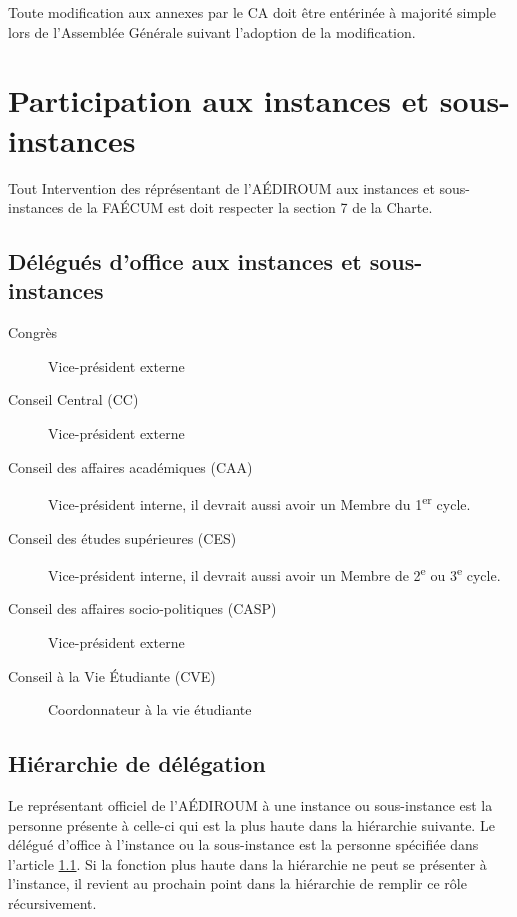 \documentclass{aediroum}
\newcommand{\article}[1]{article \ref{#1}}
\begin{document}
Toute modification aux annexes par le CA doit être entérinée à majorité simple lors de l'Assemblée Générale suivant l'adoption de la modification.

\section{Participation aux instances et sous-instances}\label{sec:hierarchie-delegues-faecum}

Tout Intervention des réprésentant de l'AÉDIROUM aux instances et sous-instances de la FAÉCUM est doit respecter la section 7 de la Charte.

\subsection{Délégués d'office aux instances et sous-instances}\label{sec:delegues-doffice-instances}
\begin{description}
\item[Congrès] Vice-président externe
\item[Conseil Central (CC)] Vice-président externe
\item[Conseil des affaires académiques (CAA)] Vice-président interne, il devrait aussi avoir un Membre du 1\textsuperscript{er} cycle.
\item[Conseil des études supérieures (CES)] Vice-président interne, il devrait aussi avoir un Membre de 2\textsuperscript{e} ou 3\textsuperscript{e} cycle.
\item[Conseil des affaires socio-politiques (CASP)] Vice-président externe
\item[Conseil à la Vie Étudiante (CVE)] Coordonnateur à la vie étudiante
\end{description}

\subsection{Hiérarchie de délégation}\label{sec:hierarchie-delegues-faecum}

Le représentant officiel de l'AÉDIROUM à une instance ou sous-instance est la personne présente à celle-ci qui est la plus haute dans la hiérarchie suivante. Le délégué d'office à l'instance ou la sous-instance est la personne spécifiée dans l'\article{sec:delegues-doffice-instances}. Si la fonction plus haute dans la hiérarchie ne peut se présenter à l'instance, il revient au prochain point dans la hiérarchie de remplir ce rôle récursivement.
\end{document}
